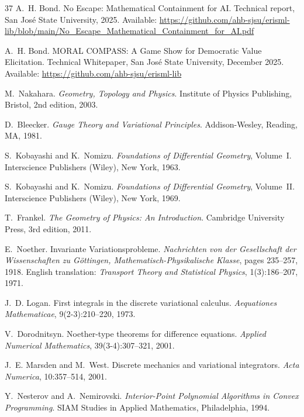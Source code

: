 \documentclass[12pt]{article}
\begin{document}
\begin{thebibliography}{37}
A.~H. Bond.
\newblock No Escape: Mathematical Containment for AI.
\newblock Technical report, San Jos\'{e} State University, 2025.
\newblock Available: \url{https://github.com/ahb-sjsu/erisml-lib/blob/main/No_Escape_Mathematical_Containment_for_AI.pdf}

A.~H. Bond.
\newblock MORAL COMPASS: A Game Show for Democratic Value Elicitation.
\newblock Technical Whitepaper, San Jos\'{e} State University, December 2025.
\newblock Available: \url{https://github.com/ahb-sjsu/erisml-lib}

M.~Nakahara.
\newblock \emph{Geometry, Topology and Physics}.
\newblock Institute of Physics Publishing, Bristol, 2nd edition, 2003.

D.~Bleecker.
\newblock \emph{Gauge Theory and Variational Principles}.
\newblock Addison-Wesley, Reading, MA, 1981.

S.~Kobayashi and K.~Nomizu.
\newblock \emph{Foundations of Differential Geometry}, Volume~I.
\newblock Interscience Publishers (Wiley), New York, 1963.

S.~Kobayashi and K.~Nomizu.
\newblock \emph{Foundations of Differential Geometry}, Volume~II.
\newblock Interscience Publishers (Wiley), New York, 1969.

T.~Frankel.
\newblock \emph{The Geometry of Physics: An Introduction}.
\newblock Cambridge University Press, 3rd edition, 2011.

E.~Noether.
\newblock Invariante Variationsprobleme.
\newblock \emph{Nachrichten von der Gesellschaft der Wissenschaften zu G\"{o}ttingen, Mathematisch-Physikalische Klasse}, pages 235--257, 1918.
\newblock English translation: \emph{Transport Theory and Statistical Physics}, 1(3):186--207, 1971.

J.~D. Logan.
\newblock First integrals in the discrete variational calculus.
\newblock \emph{Aequationes Mathematicae}, 9(2-3):210--220, 1973.

V.~Dorodnitsyn.
\newblock Noether-type theorems for difference equations.
\newblock \emph{Applied Numerical Mathematics}, 39(3-4):307--321, 2001.

J.~E. Marsden and M.~West.
\newblock Discrete mechanics and variational integrators.
\newblock \emph{Acta Numerica}, 10:357--514, 2001.

Y.~Nesterov and A.~Nemirovski.
\newblock \emph{Interior-Point Polynomial Algorithms in Convex Programming}.
\newblock SIAM Studies in Applied Mathematics, Philadelphia, 1994.


\end{thebibliography}
\end{document}
